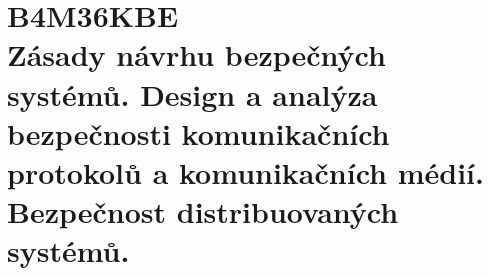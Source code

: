  \chapter[Komunikační bezpečnost]{B4M36KBE \\[1ex]\Large{Zásady návrhu bezpečných systémů. Design a analýza bezpečnosti komunikačních protokolů a komunikačních médií. Bezpečnost distribuovaných systémů.}}
 
 